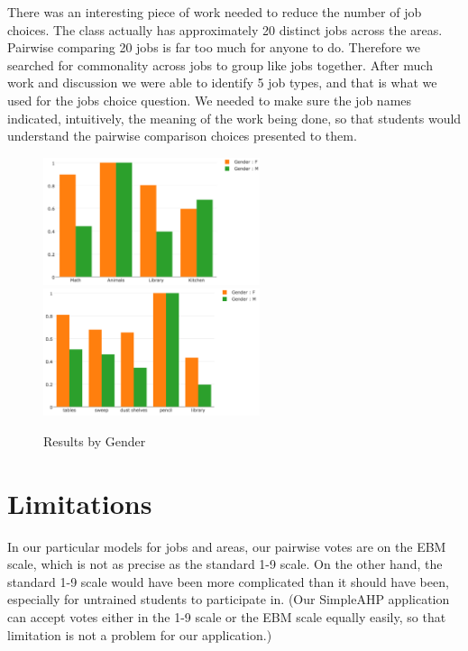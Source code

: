\documentclass[11pt]{article}
\begin{document}
There was an interesting piece of work needed to reduce the number of job choices.
The class actually has approximately 20 distinct jobs across the areas.  Pairwise
comparing 20 jobs is far too much for anyone to do.  Therefore we searched for
commonality across jobs to group like jobs together.  After much work and discussion
we were able to identify 5 job types, and that is what we used for the jobs
choice question.  We needed to make sure the job names indicated, intuitively, the
meaning of the work being done, so that students would understand the pairwise
comparison choices presented to them.
\begin{figure}
\caption{Results by Gender}
\includegraphics[width=2.5in]{AreasByGender}
\includegraphics[width=2.5in]{JobsByGender}
\label{fig1}	
\end{figure}


\section{Limitations}
In our particular models for jobs and areas, our pairwise votes are on the EBM scale, which is not as precise as the standard 1-9 scale.  On the other hand, the standard 1-9 scale would have been more complicated than it should have been, especially for untrained students to participate in.
(Our SimpleAHP application can accept votes either in the 1-9 scale or the EBM
scale equally easily, so that limitation is not a problem for our application.)
\end{document}

